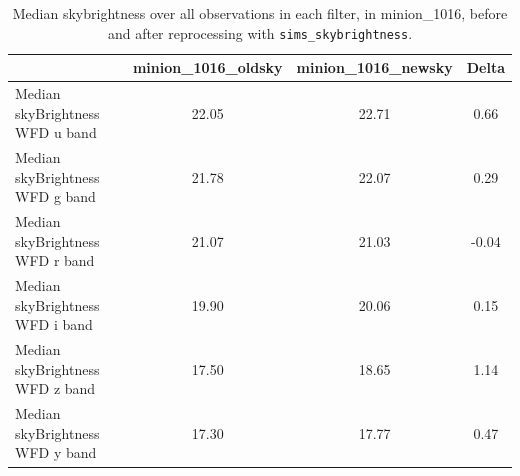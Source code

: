 \documentclass[DM,lsstdraft,authoryear,toc]{lsstdoc}
\newcommand{\simsky}{\texttt{sims\_skybrightness}\xspace}
\begin{document}
\begin{table}[htp]
\caption{Median skybrightness over all observations in each filter, in minion\_1016, before and after reprocessing with \simsky.}
\begin{center}
\begin{tabular}{lccc}
\toprule
{} &  minion\_1016\_oldsky &  minion\_1016\_newsky &    Delta \\
\midrule
Median skyBrightness WFD u band &               22.05 &               22.71 &   0.66 \\
Median skyBrightness WFD g band &               21.78 &               22.07 &   0.29 \\
Median skyBrightness WFD r band &               21.07 &               21.03 &  -0.04 \\
Median skyBrightness WFD i band &               19.90 &               20.06 &   0.15 \\
Median skyBrightness WFD z band &               17.50 &               18.65 &   1.14 \\
Median skyBrightness WFD y band &               17.30 &               17.77 &   0.47 \\
\bottomrule
\end{tabular}
\end{center}
\label{tab:medskybright}
\end{table}
\end{document}
